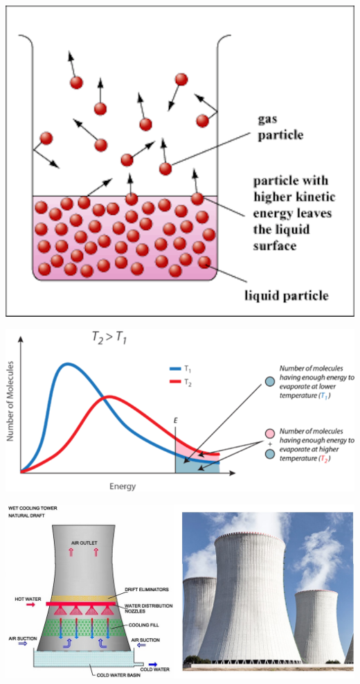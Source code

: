\documentclass[
  letterpaper,
  DIV=11,
  numbers=noendperiod]{scrreprt}
\begin{document}
\includegraphics{archive/figures/evaporation_1.gif}

\includegraphics{archive/figures/evaporation_2.png}

\includegraphics{archive/figures/cooling-tower.png}
\end{document}
